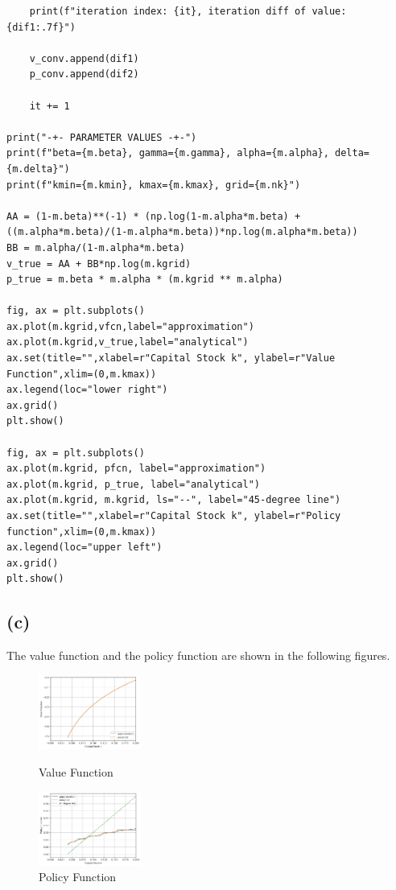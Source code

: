 \documentclass{ltjsarticle}
\begin{document}
\begin{lstlisting}
    print(f"iteration index: {it}, iteration diff of value: {dif1:.7f}")

    v_conv.append(dif1)
    p_conv.append(dif2)

    it += 1

print("-+- PARAMETER VALUES -+-")
print(f"beta={m.beta}, gamma={m.gamma}, alpha={m.alpha}, delta={m.delta}")
print(f"kmin={m.kmin}, kmax={m.kmax}, grid={m.nk}")

AA = (1-m.beta)**(-1) * (np.log(1-m.alpha*m.beta) + ((m.alpha*m.beta)/(1-m.alpha*m.beta))*np.log(m.alpha*m.beta))
BB = m.alpha/(1-m.alpha*m.beta)
v_true = AA + BB*np.log(m.kgrid)
p_true = m.beta * m.alpha * (m.kgrid ** m.alpha)

fig, ax = plt.subplots()
ax.plot(m.kgrid,vfcn,label="approximation")
ax.plot(m.kgrid,v_true,label="analytical")
ax.set(title="",xlabel=r"Capital Stock k", ylabel=r"Value Function",xlim=(0,m.kmax))
ax.legend(loc="lower right")
ax.grid()
plt.show()

fig, ax = plt.subplots()
ax.plot(m.kgrid, pfcn, label="approximation")
ax.plot(m.kgrid, p_true, label="analytical")
ax.plot(m.kgrid, m.kgrid, ls="--", label="45-degree line")
ax.set(title="",xlabel=r"Capital Stock k", ylabel=r"Policy function",xlim=(0,m.kmax))
ax.legend(loc="upper left")
ax.grid()
plt.show()
\end{lstlisting}



\subsection*{(c)}

The value function and the policy function are shown in the following figures.
\begin{figure}[H]
    \centering
    \begin{minipage}[b]{\textwidth}
        \centering
        \includegraphics[width=0.3\textwidth]{Q1C_VF.png}
        \caption{Value Function}
        \label{fig:value_function}
    \end{minipage}
    \begin{minipage}[b]{\textwidth}
        \centering
        \includegraphics[width=0.3\textwidth]{Q1C_PF.png}
        \caption{Policy Function}
        \label{fig:policy_function}
    \end{minipage}
    \label{fig:value_and_policy_functions}
\end{figure}
\end{document}
